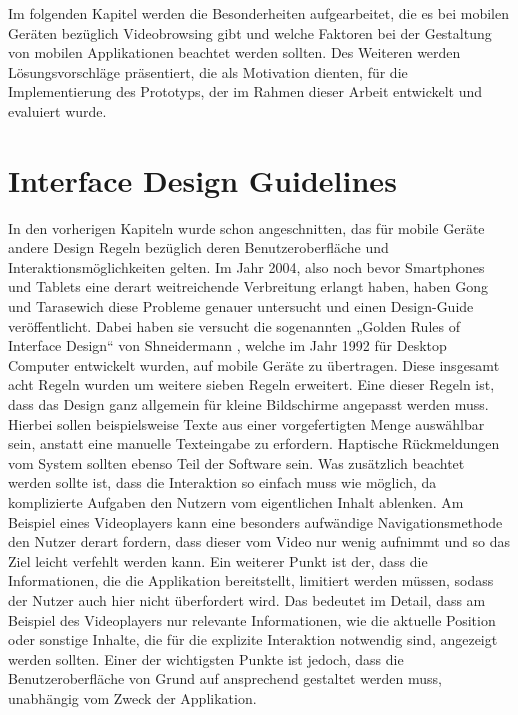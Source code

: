 \documentclass[11pt,a4paper]{report}
\begin{document}
Im folgenden Kapitel werden die Besonderheiten aufgearbeitet, die es bei mobilen Geräten bezüglich Videobrowsing gibt und welche Faktoren bei der Gestaltung von mobilen Applikationen beachtet werden sollten. Des Weiteren werden Lösungsvorschläge präsentiert, die als Motivation dienten, für die Implementierung des Prototyps, der im Rahmen dieser Arbeit entwickelt und evaluiert wurde.

\section{Interface Design Guidelines}

In den vorherigen Kapiteln wurde schon angeschnitten, das für mobile Geräte andere Design Regeln bezüglich deren Benutzeroberfläche und Interaktionsmöglichkeiten gelten. Im Jahr 2004, also noch bevor Smartphones und Tablets eine derart weitreichende Verbreitung erlangt haben, haben Gong und Tarasewich \cite{gong2004guidelines} diese Probleme genauer untersucht und einen Design-Guide veröffentlicht. Dabei haben sie versucht die sogenannten „Golden Rules of Interface Design“ von Shneidermann \cite{shneiderman1992designing}, welche im Jahr 1992 für Desktop Computer entwickelt wurden, auf mobile Geräte zu übertragen. Diese insgesamt acht Regeln wurden um weitere sieben Regeln erweitert. Eine dieser Regeln ist, dass das Design ganz allgemein für kleine Bildschirme angepasst werden muss. Hierbei sollen beispielsweise Texte aus einer vorgefertigten Menge auswählbar sein, anstatt eine manuelle Texteingabe zu erfordern. Haptische Rückmeldungen vom System sollten ebenso Teil der Software sein. Was zusätzlich beachtet werden sollte ist, dass die Interaktion so einfach muss wie möglich, da komplizierte Aufgaben den Nutzern vom eigentlichen Inhalt ablenken. Am Beispiel eines Videoplayers kann eine besonders aufwändige Navigationsmethode den Nutzer derart fordern, dass dieser vom Video nur wenig aufnimmt und so das Ziel leicht verfehlt werden kann. Ein weiterer Punkt ist der, dass die Informationen, die die Applikation bereitstellt, limitiert werden müssen, sodass der Nutzer auch hier nicht überfordert wird. Das bedeutet im Detail, dass am Beispiel des Videoplayers nur relevante Informationen, wie die aktuelle Position oder sonstige Inhalte, die für die explizite Interaktion notwendig sind, angezeigt werden sollten. Einer der wichtigsten Punkte ist jedoch, dass die Benutzeroberfläche von Grund auf ansprechend gestaltet werden muss, unabhängig vom Zweck der Applikation. \cite{gong2004guidelines}
\end{document}
